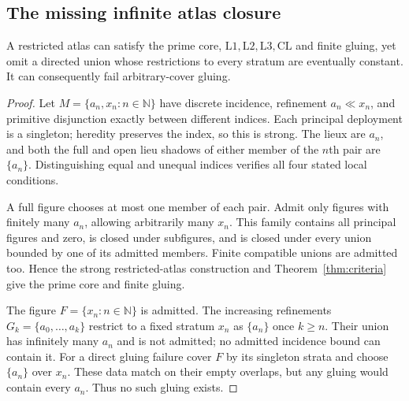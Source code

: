 \subsection{The missing infinite atlas closure}
\begin{counterexample}
\label{ex:restricted-infinite}
A restricted atlas can satisfy the prime core,
$\mathrm L1,\mathrm L2,\mathrm L3,\mathrm{CL}$ and finite gluing,
yet omit a directed union whose restrictions to every stratum
are eventually constant. It can consequently fail arbitrary-cover
gluing.
\end{counterexample}
\begin{proof}
Let $M=\{a_n,x_n:n\in\mathbb N\}$ have discrete incidence,
refinement $a_n\ll x_n$, and primitive disjunction exactly between
different indices. Each principal deployment is a singleton;
heredity preserves the index, so this is strong. The lieux are
$a_n$, and both the full and open lieu shadows of either member
of the $n$th pair are $\{a_n\}$. Distinguishing equal and unequal
indices verifies all four stated local conditions.

A full figure chooses at most one member of each pair. Admit
only figures with finitely many $a_n$, allowing arbitrarily
many $x_n$. This family contains all principal figures and zero,
is closed under subfigures, and is closed under every union
bounded by one of its admitted members. Finite compatible unions
are admitted too. Hence the strong restricted-atlas construction
and Theorem~\ref{thm:criteria} give the prime core and finite gluing.

The figure $F=\{x_n:n\in\mathbb N\}$ is admitted. The increasing
refinements $G_k=\{a_0,\ldots,a_k\}$ restrict to a fixed stratum
$x_n$ as $\{a_n\}$ once $k\geq n$. Their union has infinitely
many $a_n$ and is not admitted; no admitted incidence bound can
contain it. For a direct gluing failure cover $F$ by its singleton
strata and choose $\{a_n\}$ over $x_n$. These data match on their
empty overlaps, but any gluing would contain every $a_n$.
Thus no such gluing exists.
\end{proof}
